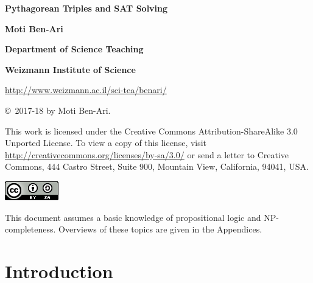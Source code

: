 \documentclass[11pt,a4paper]{article}
\begin{document}
\thispagestyle{empty}

\begin{center}

\textbf{\huge Pythagorean Triples and SAT Solving}

\bigskip
\bigskip
\bigskip

\textbf{\LARGE Moti Ben-Ari}

\bigskip

\textbf{\Large Department of Science Teaching}

\bigskip

\textbf{\Large Weizmann Institute of Science}

\bigskip

\url{http://www.weizmann.ac.il/sci-tea/benari/}

\end{center}

\bigskip
\bigskip

\begin{center}
\copyright{}\  2017-18 by Moti Ben-Ari.
\end{center}

\begin{footnotesize}
This work is licensed under the Creative Commons Attribution-ShareAlike 3.0 Unported License. To view a copy of this license, visit \url{http://creativecommons.org/licenses/by-sa/3.0/} or send a letter to Creative Commons, 444 Castro Street, Suite 900, Mountain View, California, 94041, USA.
\end{footnotesize}

\bigskip

\begin{center}
\includegraphics[width=.2\textwidth]{../by-sa.png}
\end{center}

\newpage



This document assumes a basic knowledge of propositional logic and NP-completeness. Overviews of these topics are given in the Appendices.

\section{Introduction}
\end{document}
